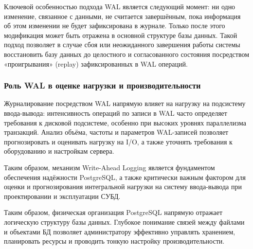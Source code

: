 Ключевой особенностью подхода WAL является следующий момент: ни одно изменение, связанное с данными, 
не считается завершённым, пока информация об этом изменении не будет зафиксирована в журнале. Только после этого модификация 
может быть отражена в основной структуре базы данных. Такой подход позволяет в случае сбоя или неожиданного завершения 
работы системы восстановить базу данных до целостного и согласованного состояния посредством «проигрывания» (replay) 
зафиксированных в WAL операций. \cite{Oparina2024}

\subsubsection{Роль WAL в оценке нагрузки и производительности}

Журналирование посредством WAL напрямую влияет на нагрузку на подсистему ввода-вывода: интенсивность операций по записи в WAL 
часто определяет требования к дисковой подсистеме, особенно при высоких уровнях параллелизма транзакций. 
Анализ объёма, частоты и параметров WAL-записей позволяет прогнозировать и оценивать нагрузку на I/O, 
а также уточнять требования к оборудованию и настройкам сервера. \cite{postgres-docs}

\vspace{1em} Таким образом, механизм Write-Ahead Logging является фундаментом обеспечения надёжности PostgreSQL, а также критически важным фактором для оценки и прогнозирования интегральной нагрузки на систему ввода-вывода при проектировании и эксплуатации СУБД.

\bigskip

Таким образом, физическая организация PostgreSQL напрямую отражает логическую структуру базы данных. 
Глубокое понимание связей между файлами и объектами БД позволяет администратору эффективно управлять хранением, планировать ресурсы и проводить тонкую настройку производительности.

